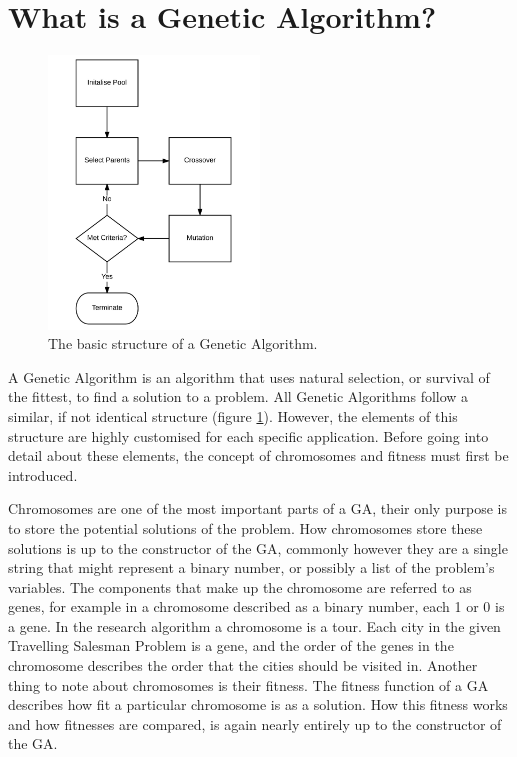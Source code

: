 \section{What is a Genetic Algorithm?}\label{WisGA}
\begin{figure}[h]
	\centering
		\includegraphics[width=0.5\textwidth]{GA_Structure}
	\caption{The basic structure of a Genetic Algorithm.}
	\label{struct}
\end{figure}
\noindent
A Genetic Algorithm is an algorithm that uses natural selection, or survival of the fittest, to find a solution to a problem. All Genetic Algorithms follow a similar, if not identical structure (figure \ref{struct}). However, the elements of this structure are highly customised for each specific application. Before going into detail about these elements, the concept of chromosomes and fitness must first be introduced.
\par
Chromosomes are one of the most important parts of a GA, their only purpose is to store the potential solutions of the problem. How chromosomes store these solutions is up to the constructor of the GA, commonly however they are a single string that might represent a binary number, or possibly a list of the problem's variables. The components that make up the chromosome are referred to as genes, for example in a chromosome described as a binary number, each 1 or 0 is a gene. In the research algorithm a chromosome is a tour. Each city in the given Travelling Salesman Problem is a gene, and the order of the genes in the chromosome describes the order that the cities should be visited in. Another thing to note about chromosomes is their fitness. The fitness function of a GA describes how fit a particular chromosome is as a solution. How this fitness works and how fitnesses are compared, is again nearly entirely up to the constructor of the GA.


